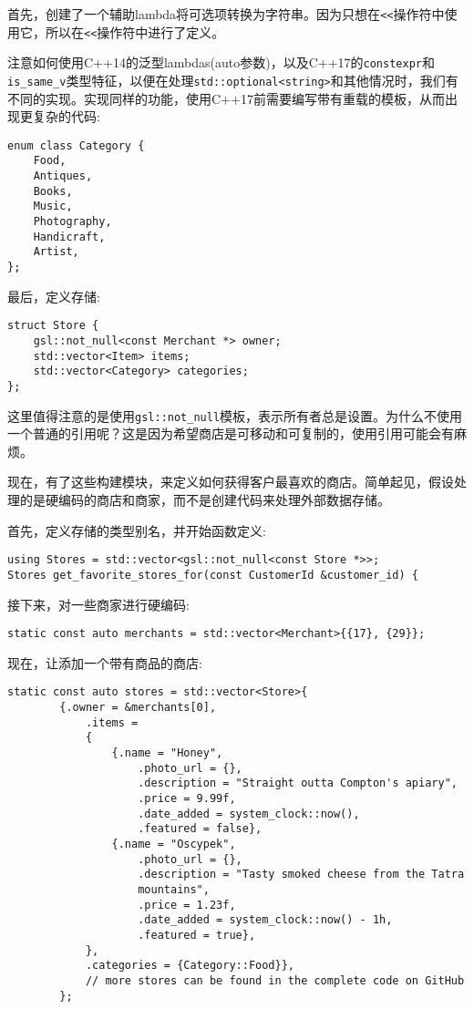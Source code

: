 首先，创建了一个辅助lambda将可选项转换为字符串。因为只想在\texttt{<<}操作符中使用它，所以在\texttt{<<}操作符中进行了定义。

注意如何使用C++14的泛型lambdas(auto参数)，以及C++17的\texttt{constexpr}和\texttt{is\_same\_v}类型特征，以便在处理\texttt{std::optional<string>}和其他情况时，我们有不同的实现。实现同样的功能，使用C++17前需要编写带有重载的模板，从而出现更复杂的代码:

\begin{lstlisting}[style=styleCXX]
enum class Category {
	Food,
	Antiques,
	Books,
	Music,
	Photography,
	Handicraft,
	Artist,
};
\end{lstlisting}

最后，定义存储:

\begin{lstlisting}[style=styleCXX]
struct Store {
	gsl::not_null<const Merchant *> owner;
	std::vector<Item> items;
	std::vector<Category> categories;
};
\end{lstlisting}

这里值得注意的是使用\texttt{gsl::not\_null}模板，表示所有者总是设置。为什么不使用一个普通的引用呢？这是因为希望商店是可移动和可复制的，使用引用可能会有麻烦。

现在，有了这些构建模块，来定义如何获得客户最喜欢的商店。简单起见，假设处理的是硬编码的商店和商家，而不是创建代码来处理外部数据存储。

首先，定义存储的类型别名，并开始函数定义:

\begin{lstlisting}[style=styleCXX]
using Stores = std::vector<gsl::not_null<const Store *>>;
Stores get_favorite_stores_for(const CustomerId &customer_id) {
\end{lstlisting}

接下来，对一些商家进行硬编码:

\begin{lstlisting}[style=styleCXX]
	static const auto merchants = std::vector<Merchant>{{17}, {29}};
\end{lstlisting}

现在，让添加一个带有商品的商店:

\begin{lstlisting}[style=styleCXX]
	static const auto stores = std::vector<Store>{
		{.owner = &merchants[0],
			.items =
			{
				{.name = "Honey",
					.photo_url = {},
					.description = "Straight outta Compton's apiary",
					.price = 9.99f,
					.date_added = system_clock::now(),
					.featured = false},
				{.name = "Oscypek",
					.photo_url = {},
					.description = "Tasty smoked cheese from the Tatra
					mountains",
					.price = 1.23f,
					.date_added = system_clock::now() - 1h,
					.featured = true},
			},
			.categories = {Category::Food}},
			// more stores can be found in the complete code on GitHub
		};
\end{lstlisting}

